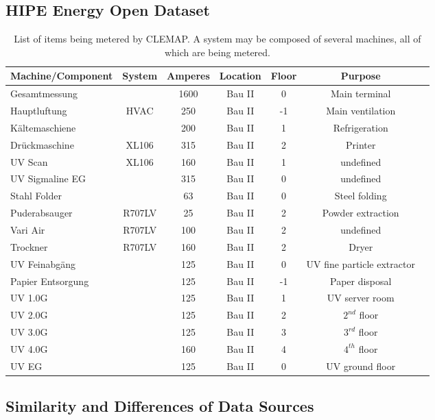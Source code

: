 \subsection{HIPE Energy Open Dataset}

\begin{table}[htbp]
    \renewcommand{\arraystretch}{1.2}
    \centering
    \begin{tabular}{lcccccc}
    \hline
         Machine/Component & System & Amperes & Location & Floor & Purpose  \\
    \hline
    Gesamtmessung & & 1600 & Bau II & 0 & Main terminal \\
    Hauptluftung & HVAC & 250 & Bau II & -1 & Main ventilation \\
    Kältemaschiene & & 200 & Bau II & 1 & Refrigeration \\
    Drückmaschine & XL106 & 315 & Bau II & 2 & Printer \\
    UV Scan & XL106 & 160 & Bau II & 1 & undefined \\
    UV Sigmaline EG & & 315 & Bau II & 0 & undefined \\
    Stahl Folder & & 63 & Bau II & 0 & Steel folding \\
    Puderabsauger & R707LV & 25 & Bau II & 2 & Powder extraction \\
    Vari Air & R707LV & 100 & Bau II & 2 & undefined \\
    Trockner & R707LV & 160 & Bau II & 2 & Dryer \\
    UV Feinabgäng & & 125 & Bau II & 0 & UV fine particle extractor \\
    Papier Entsorgung & & 125 & Bau II & -1 & Paper disposal \\
    UV 1.0G & & 125 & Bau II & 1 & UV server room \\
    UV 2.0G & & 125 & Bau II & 2 & $2^{nd}$ floor \\
    UV 3.0G & & 125 & Bau II & 3 & $3^{rd}$ floor \\
    UV 4.0G & & 160 & Bau II & 4 & $4^{th}$ floor \\
    UV EG & & 125 & Bau II & 0 & UV ground floor \\
    \hline
    \end{tabular}
    \caption{List of items being metered by CLEMAP. A system may be composed of several machines, all of which are being metered.}
    \label{tab:my_label}
\end{table}

\subsection{Similarity and Differences of Data Sources}